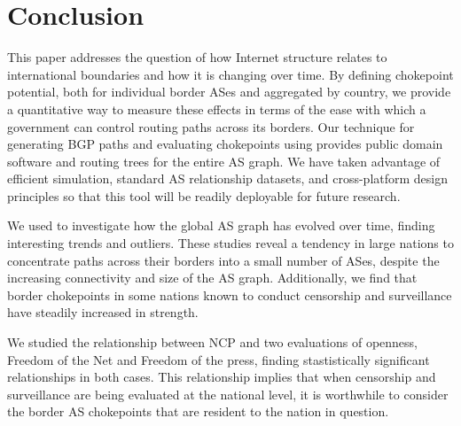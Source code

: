 \section{Conclusion}
This paper addresses the question of how Internet structure relates to 
international boundaries and how it is changing over time.  By defining chokepoint
potential, both for individual border ASes and aggregated by country,
we provide a quantitative way to measure these effects in terms of the ease
with which a government can control routing paths across its borders. 
Our technique for generating BGP paths and evaluating chokepoints
using \toolname{} provides public domain software and routing trees for the entire AS graph.
We have taken advantage of efficient simulation, standard AS relationship datasets, and cross-platform
design principles so that this tool will be readily deployable for future research.
\par We used \toolname{} to investigate how the global AS graph has
evolved over time, finding interesting trends and outliers. These
studies reveal a tendency in large nations to concentrate paths across
their borders into a small number of ASes, despite the increasing
connectivity and size of the AS graph. Additionally, we find that border
chokepoints in some nations known to conduct censorship and
surveillance have steadily increased in strength.
\par
We studied the relationship between NCP and two evaluations of openness, Freedom of the Net  and Freedom of the press, finding stastistically significant relationships in both cases.
This relationship implies that when censorship and surveillance are
being evaluated at the national level, it is worthwhile to consider
the border AS chokepoints that are resident to the nation in question.
